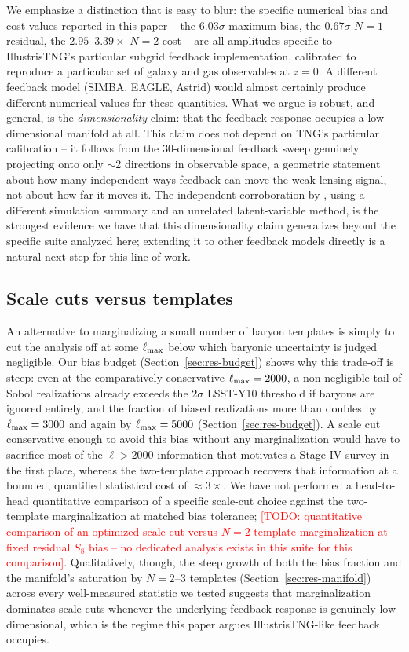 \documentclass[11pt]{article}
\newcommand{\todo}[1]{\textcolor{red}{[TODO: #1]}}
\begin{document}
We emphasize a distinction that is easy to blur: the specific numerical bias
and cost values reported in this paper -- the $6.03\sigma$ maximum bias, the
$0.67\sigma$ $N=1$ residual, the $2.95$--$3.39\times$ $N=2$ cost -- are all
amplitudes specific to IllustrisTNG's particular subgrid feedback
implementation, calibrated to reproduce a particular set of galaxy and gas
observables at $z=0$. A different feedback model (SIMBA, EAGLE, Astrid) would
almost certainly produce different numerical values for these quantities.
What we argue is robust, and general, is the \emph{dimensionality} claim:
that the feedback response occupies a low-dimensional manifold at all. This
claim does not depend on TNG's particular calibration -- it follows from the
30-dimensional feedback sweep genuinely projecting onto only $\sim$2
directions in observable space, a geometric statement about how many
independent ways feedback can move the weak-lensing signal, not about how
far it moves it. The independent corroboration by \citet{lin2026}, using a
different simulation summary and an unrelated latent-variable method, is the
strongest evidence we have that this dimensionality claim generalizes beyond
the specific suite analyzed here; extending it to other feedback models
directly is a natural next step for this line of work.

\subsection{Scale cuts versus templates}\label{sec:disc-scalecuts}

An alternative to marginalizing a small number of baryon templates is simply
to cut the analysis off at some $\ell_{\rm max}$ below which baryonic
uncertainty is judged negligible. Our bias budget (Section~\ref{sec:res-budget})
shows why this trade-off is steep: even at the comparatively conservative
$\ell_{\rm max}=2000$, a non-negligible tail of Sobol realizations already
exceeds the $2\sigma$ LSST-Y10 threshold if baryons are ignored entirely,
and the fraction of biased realizations more than doubles by
$\ell_{\rm max}=3000$ and again by $\ell_{\rm max}=5000$
(Section~\ref{sec:res-budget}). A scale cut conservative enough to avoid
this bias without any marginalization would have to sacrifice most of the
$\ell>2000$ information that motivates a Stage-IV survey in the first place,
whereas the two-template approach recovers that information at a bounded,
quantified statistical cost of $\approx3\times$. We have not performed a
head-to-head quantitative comparison of a specific scale-cut choice against
the two-template marginalization at matched bias tolerance; \todo{quantitative
comparison of an optimized scale cut versus $N=2$ template marginalization
at fixed residual $S_8$ bias -- no dedicated analysis exists in this suite
for this comparison}. Qualitatively, though, the steep growth of both the
bias fraction and the manifold's saturation by $N=2$--3 templates
(Section~\ref{sec:res-manifold}) across every well-measured statistic we
tested suggests that marginalization dominates scale cuts whenever the
underlying feedback response is genuinely low-dimensional, which is the
regime this paper argues IllustrisTNG-like feedback occupies.
\end{document}
